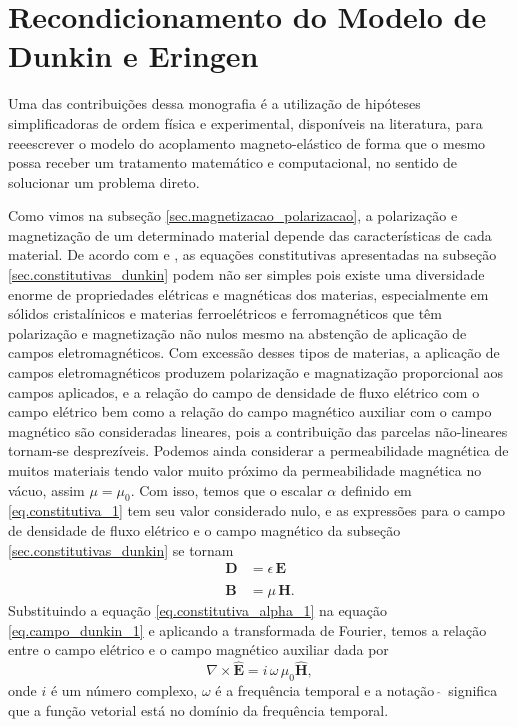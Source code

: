 \chapter{Recondicionamento do Modelo de Dunkin e Eringen}\label{sec.recon_model_dun_eri}
Uma das contribui\c{c}\~oes dessa monografia \'e a utiliza\c{c}\~ao de hip\'oteses simplificadoras de ordem f\'isica e experimental, dispon\'iveis na literatura, para reeescrever o modelo do acoplamento magneto-el\'astico de forma que o mesmo possa receber um tratamento matem\'atico e computacional, no sentido de solucionar um problema direto.

Como vimos na subse\c{c}\~ao \ref{sec.magnetizacao_polarizacao}, a polariza\c{c}\~ao e magnetiza\c{c}\~ao de um determinado material depende das caracter\'isticas de cada material. De acordo com \cite{jackson_classical_1999} e \cite{griffiths}, as equa\c{c}\~oes constitutivas apresentadas na subse\c{c}\~ao \ref{sec.constitutivas_dunkin} podem n\~ao ser simples pois existe uma diversidade enorme de propriedades el\'etricas e magn\'eticas dos materias, especialmente em s\'olidos cristal\'inicos  e materias ferroel\'etricos e ferromagn\'eticos que t\^em polariza\c{c}\~ao e magnetiza\c{c}\~ao n\~ao nulos mesmo na absten\c{c}\~ao de aplica\c{c}\~ao de campos eletromagn\'eticos. Com excess\~ao desses tipos de materias, a aplica\c{c}\~ao de campos eletromagn\'eticos produzem polariza\c{c}\~ao e magnatiza\c{c}\~ao proporcional aos campos aplicados, e a rela\c{c}\~ao do campo de densidade de fluxo el\'etrico com o campo el\'etrico bem como a rela\c{c}\~ao do campo magn\'etico auxiliar com o campo magn\'etico s\~ao consideradas lineares, pois a contribui\c{c}\~ao das parcelas n\~ao-lineares tornam-se desprez\'iveis. Podemos ainda considerar a permeabilidade magn\'etica de muitos materiais tendo valor muito pr\'oximo da permeabilidade magn\'etica no v\'acuo, assim $\mu=\mu_0$. Com isso, temos que o escalar $\alpha$ definido em \ref{eq.constitutiva_1} tem seu valor considerado nulo, e as express\~oes para o campo de densidade de fluxo el\'etrico e o campo magn\'etico da subse\c{c}\~ao \ref{sec.constitutivas_dunkin} se tornam
\begin{align}\label{eq.constitutiva_alpha_1}
\mathbf{D}&=\epsilon\,\mathbf{E}\\\nonumber\\\label{eq.constitutiva_alpha_2}
\mathbf{B}&=\mu\,\mathbf{H}.
\end{align}
Substituindo a equa\c{c}\~ao \ref{eq.constitutiva_alpha_1} na equa\c{c}\~ao \ref{eq.campo_dunkin_1} e aplicando a transformada de Fourier, temos a rela\c{c}\~ao entre o campo el\'etrico e o campo magn\'etico auxiliar dada por
\begin{equation}
\nabla\times\mathbf{\widehat{E}}=i\,\omega\,\mu_0\mathbf{\widehat{H}},
\end{equation}
onde $i$ \'e um n\'umero complexo, $\omega$ \'e a frequ\^encia temporal e a nota\c{c}\~ao $\widehat{\,\,}$ significa que a fun\c{c}\~ao vetorial est\'a no dom\'inio da frequ\^encia temporal.

